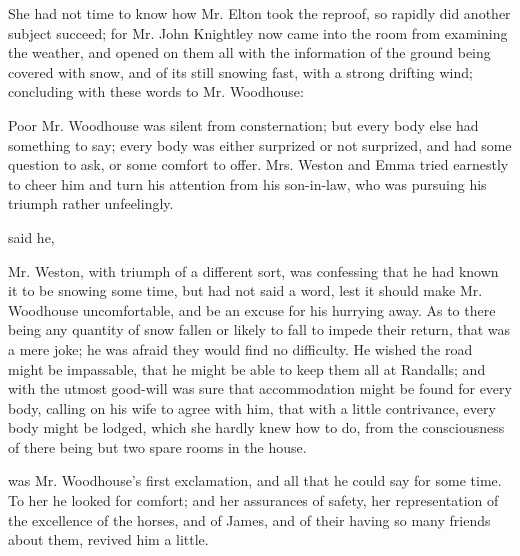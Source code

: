 She had not time to know how Mr. Elton took the reproof, so rapidly did another subject succeed; for Mr. John Knightley now came into the room from examining the weather, and opened on them all with the information of the ground being covered with snow, and of its still snowing fast, with a strong drifting wind; concluding with these words to Mr. Woodhouse:


Poor Mr. Woodhouse was silent from consternation; but every body else had something to say; every body was either surprized or not surprized, and had some question to ask, or some comfort to offer. Mrs. Weston and Emma tried earnestly to cheer him and turn his attention from his son-in-law, who was pursuing his triumph rather unfeelingly.

 said he, 

Mr. Weston, with triumph of a different sort, was confessing that he had known it to be snowing some time, but had not said a word, lest it should make Mr. Woodhouse uncomfortable, and be an excuse for his hurrying away. As to there being any quantity of snow fallen or likely to fall to impede their return, that was a mere joke; he was afraid they would find no difficulty. He wished the road might be impassable, that he might be able to keep them all at Randalls; and with the utmost good-will was sure that accommodation might be found for every body, calling on his wife to agree with him, that with a little contrivance, every body might be lodged, which she hardly knew how to do, from the consciousness of there being but two spare rooms in the house.

 was Mr. Woodhouse's first exclamation, and all that he could say for some time. To her he looked for comfort; and her assurances of safety, her representation of the excellence of the horses, and of James, and of their having so many friends about them, revived him a little.

